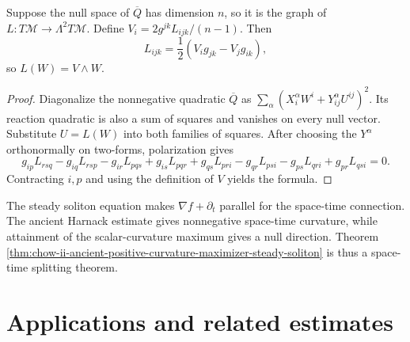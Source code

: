 \begin{lemma}
\label{lem:chow-ii-nullspace-map-is-wedge-map}


Suppose the null space of \(\overline Q\) has dimension \(n\), so it is the
graph of \(L:T\mathcal M\to\Lambda^2T\mathcal M\).  Define
\(V_i=2g^{jk}L_{ijk}/(n-1)\).  Then
\[
L_{ijk}=\frac12(V_ig_{jk}-V_jg_{ik}),
\]
so \(L(W)=V\wedge W\).
\end{lemma}
\begin{proof}
\sketch Diagonalize the nonnegative quadratic \(\overline Q\) as
\(\sum_\alpha(X_i^\alpha W^i+Y_{ij}^\alpha U^{ij})^2\).  Its reaction
quadratic is also a sum of squares and vanishes on every null vector.
Substitute \(U=L(W)\) into both families of squares.  After choosing the
\(Y^\alpha\) orthonormally on two-forms, polarization gives
\[
g_{ip}L_{rsq}-g_{iq}L_{rsp}-g_{ir}L_{pqs}+g_{is}L_{pqr}
+g_{qs}L_{pri}-g_{qr}L_{psi}-g_{ps}L_{qri}+g_{pr}L_{qsi}=0.
\]
Contracting \(i,p\) and using the definition of \(V\) yields the formula.
\end{proof}

\begin{remark}
\label{rem:chow-ii-ancient-rigidity-spacetime-splitting}

The steady soliton equation makes \(\nabla f+\partial_t\) parallel for the
space-time connection.  The ancient Harnack estimate gives nonnegative
space-time curvature, while attainment of the scalar-curvature maximum gives
a null direction.  Theorem
\ref{thm:chow-ii-ancient-positive-curvature-maximizer-steady-soliton} is thus a
space-time splitting theorem.
\end{remark}

\section{Applications and related estimates}

